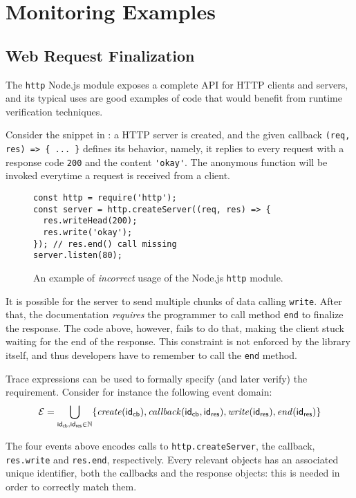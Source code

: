 \section{Monitoring Examples}
\label{sec:examples}
\subsection{Web Request Finalization}
The \lstinline{http} Node.js module exposes a complete API for HTTP clients and servers, and its typical uses are good examples of code that would benefit from runtime verification techniques.

Consider the snippet in : a HTTP server is created, and the given callback \lstinline|(req, res) => { ... }| defines its behavior, namely, it replies to every request with a response code \lstinline{200} and the content \lstinline{'okay'}.
The anonymous function will be invoked everytime a request is received from a client.

\begin{figure}[h]
\begin{lstlisting}
const http = require('http');
const server = http.createServer((req, res) => {
  res.writeHead(200);
  res.write('okay');
}); // res.end() call missing
server.listen(80);
\end{lstlisting}
\caption{An example of \emph{incorrect} usage of the Node.js \lstinline{http} module.}
\label{lst:end}
\end{figure}

It is possible for the server to send multiple chunks of data calling \lstinline{write}.
After that, the documentation \emph{requires} the programmer to call method \lstinline{end} to finalize the response.
The code above, however, fails to do that, making the client stuck waiting for the end of the response.
This constraint is not enforced by the library itself, and thus developers have to remember to call the \lstinline{end} method.

Trace expressions can be used to formally specify (and later verify) the requirement.
Consider for instance the following event domain:
\[ \mathcal{E} = \bigcup_{\mathsf{id_{cb}},\mathsf{id_{res}} \in \mathbb{N}} \{\mathit{create}(\mathsf{id_{cb}}), \mathit{callback}(\mathsf{id_{cb}}, \mathsf{id_{res}}), \mathit{write}(\mathsf{id_{res}}), \mathit{end}(\mathsf{id_{res}}) \} \]

The four events above encodes calls to \lstinline{http.createServer}, the callback, \lstinline{res.write} and \lstinline{res.end}, respectively.
Every relevant objects has an associated unique identifier, both the callbacks and the response objects: this is needed in order to correctly match them.

